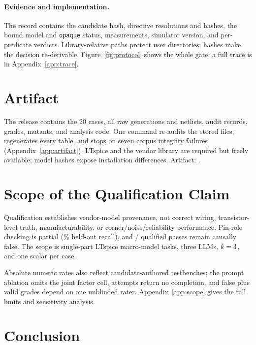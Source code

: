 \paragraph{Evidence and implementation.}
The record contains the candidate hash, directive resolutions and hashes, the
bound model and \texttt{opaque} status, measurements, simulator version, and
per-predicate verdicts. Library-relative paths protect user directories; hashes
make the decision re-derivable. Figure~\ref{fig:protocol} shows the whole gate; a full
trace is in Appendix~\ref{app:trace}.

\section{Artifact}
\label{sec:artifact}

The release contains the 20 cases, all \CorpusTotal{} raw generations and
netlists, audit records, grades, mutants, and analysis code. One command
re-audits the stored files, regenerates every table, and stops on seven corpus
integrity failures (Appendix~\ref{app:artifact}). LTspice and the vendor
library are required but freely available; model hashes expose installation
differences. Artifact: \artifacturl.

\section{Scope of the Qualification Claim}
\label{sec:scope}

Qualification establishes vendor-model provenance, not correct wiring,
transistor-level truth, manufacturability, or corner/noise/reliability
performance. Pin-role checking is partial (\MutPinPermuteRate{}\% held-out
recall), and \ProvFN{}/\StageProvAccepted{} qualified passes remain causally
false. The scope is single-part LTspice macro-model tasks, three LLMs,
$k=3{}$, and one scalar per case.

Absolute numeric rates also reflect candidate-authored testbenches; the prompt
ablation omits the joint factor cell, \NumNoCompletion{} attempts return no
completion, and \GroundsFakeRead{} false plus \GroundsValidRead{} valid grades
depend on one unblinded rater. Appendix~\ref{app:scope} gives the full limits
and sensitivity analysis.

\section{Conclusion}
\label{sec:conclusion}

